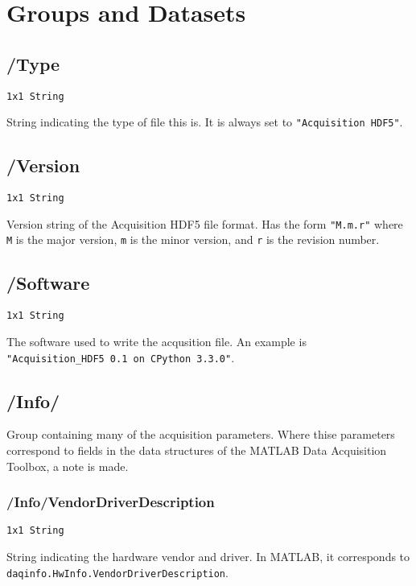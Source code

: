 \documentclass[12pt]{article} %
\begin{document}
\section{Groups and Datasets}

\subsection{/Type}

\verb|1x1 String|

String indicating the type of file this is.
It is always set to \verb|"Acquisition HDF5"|.



\subsection{/Version}

\verb|1x1 String|

Version string of the Acquisition HDF5 file format.
Has the form \verb|"M.m.r"| where  \verb|M| is the major version, \verb|m| is the minor version, and \verb|r| is the revision number.


\subsection{/Software} \label{sec:software}

\verb|1x1 String|

The software used to write the acqusition file.
An example is \\ \verb|"Acquisition_HDF5 0.1 on CPython 3.3.0"|.


\subsection{/Info/}

Group containing many of the acquisition parameters.
Where thise parameters correspond to fields in the data structures of the MATLAB\textsuperscript{\textregistered} Data Acquisition Toolbox\textsuperscript{\texttrademark}, a note is made.



\subsubsection{/Info/VendorDriverDescription}

\verb|1x1 String|

String indicating the hardware vendor and driver.
In MATLAB\textsuperscript{\textregistered}, it corresponds to \\ \verb|daqinfo.HwInfo.VendorDriverDescription|.
\end{document}
